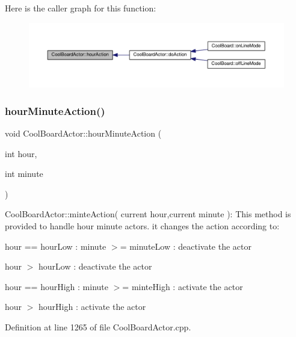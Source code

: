 Here is the caller graph for this function\+:\nopagebreak
\begin{figure}[H]
\begin{center}
\leavevmode
\includegraphics[width=350pt]{dc/d69/class_cool_board_actor_adf3b4e15b9d73681082112adf8ef95cb_icgraph}
\end{center}
\end{figure}
\mbox{\label{class_cool_board_actor_a1eb1fbca19bc80aad20d2686d52317f8}} 
\subsubsection{\texorpdfstring{hour\+Minute\+Action()}{hourMinuteAction()}}
{\footnotesize\ttfamily void Cool\+Board\+Actor\+::hour\+Minute\+Action (\begin{DoxyParamCaption}\item[{int}]{hour,  }\item[{int}]{minute }\end{DoxyParamCaption})}

Cool\+Board\+Actor\+::minte\+Action( current hour,current minute )\+: This method is provided to handle hour minute actors. it changes the action according to\+:

hour == hour\+Low \+: minute $>$= minute\+Low \+: deactivate the actor

hour $>$ hour\+Low \+: deactivate the actor

hour == hour\+High \+: minute $>$= minte\+High \+: activate the actor

hour $>$ hour\+High \+: activate the actor 

Definition at line 1265 of file Cool\+Board\+Actor.\+cpp.


